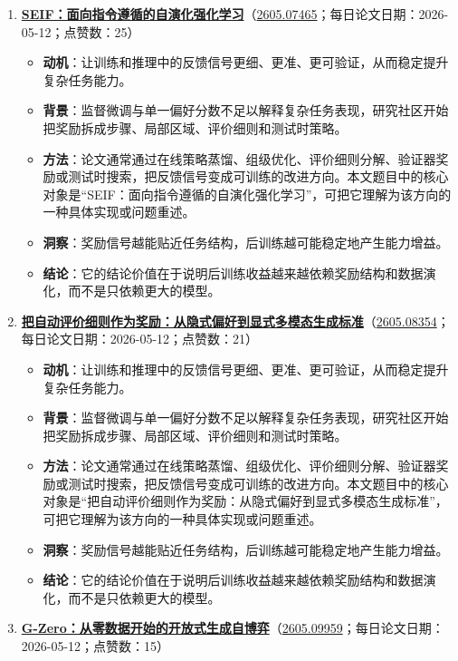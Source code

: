 \begin{enumerate}[leftmargin=1.5em]
\begin{itemize}[leftmargin=1.5em]
  \end{itemize}
  \item \textbf{\href{https://huggingface.co/papers/2605.07465}{SEIF：面向指令遵循的自演化强化学习}}（\href{https://arxiv.org/abs/2605.07465}{2605.07465}；每日论文日期：2026-05-12；点赞数：25）
  \begin{itemize}[leftmargin=1.5em]
    \item \textbf{动机}：让训练和推理中的反馈信号更细、更准、更可验证，从而稳定提升复杂任务能力。
    \item \textbf{背景}：监督微调与单一偏好分数不足以解释复杂任务表现，研究社区开始把奖励拆成步骤、局部区域、评价细则和测试时策略。
    \item \textbf{方法}：论文通常通过在线策略蒸馏、组级优化、评价细则分解、验证器奖励或测试时搜索，把反馈信号变成可训练的改进方向。本文题目中的核心对象是“SEIF：面向指令遵循的自演化强化学习”，可把它理解为该方向的一种具体实现或问题重述。
    \item \textbf{洞察}：奖励信号越能贴近任务结构，后训练越可能稳定地产生能力增益。
    \item \textbf{结论}：它的结论价值在于说明后训练收益越来越依赖奖励结构和数据演化，而不是只依赖更大的模型。
  \end{itemize}
  \item \textbf{\href{https://huggingface.co/papers/2605.08354}{把自动评价细则作为奖励：从隐式偏好到显式多模态生成标准}}（\href{https://arxiv.org/abs/2605.08354}{2605.08354}；每日论文日期：2026-05-12；点赞数：21）
  \begin{itemize}[leftmargin=1.5em]
    \item \textbf{动机}：让训练和推理中的反馈信号更细、更准、更可验证，从而稳定提升复杂任务能力。
    \item \textbf{背景}：监督微调与单一偏好分数不足以解释复杂任务表现，研究社区开始把奖励拆成步骤、局部区域、评价细则和测试时策略。
    \item \textbf{方法}：论文通常通过在线策略蒸馏、组级优化、评价细则分解、验证器奖励或测试时搜索，把反馈信号变成可训练的改进方向。本文题目中的核心对象是“把自动评价细则作为奖励：从隐式偏好到显式多模态生成标准”，可把它理解为该方向的一种具体实现或问题重述。
    \item \textbf{洞察}：奖励信号越能贴近任务结构，后训练越可能稳定地产生能力增益。
    \item \textbf{结论}：它的结论价值在于说明后训练收益越来越依赖奖励结构和数据演化，而不是只依赖更大的模型。
  \end{itemize}
  \item \textbf{\href{https://huggingface.co/papers/2605.09959}{G-Zero：从零数据开始的开放式生成自博弈}}（\href{https://arxiv.org/abs/2605.09959}{2605.09959}；每日论文日期：2026-05-12；点赞数：15）

\end{enumerate}

